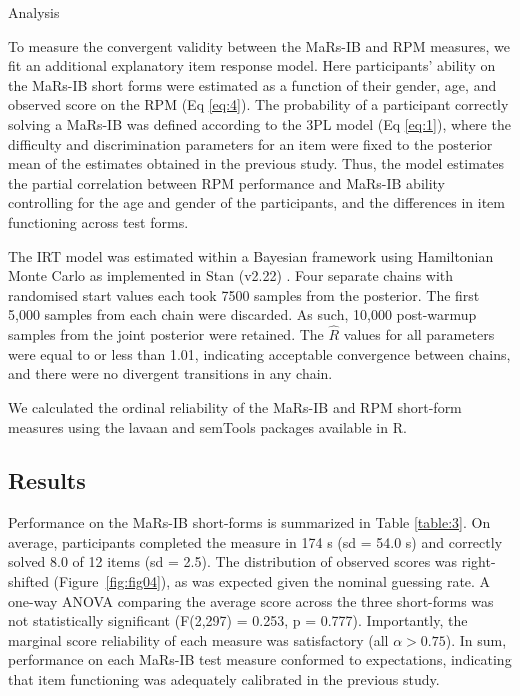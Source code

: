 \documentclass[a4paper,man,natbib]{apa6}
\makeatletter
\renewcommand{\subsubsection}{\@startsection{subsubsection}{3}
  {\z@}%
  {\b@level@two@skip}{\e@level@two@skip}%
  {\normalfont\normalsize\bfseries}}
\makeatother
\begin{document}
\subsubsection{Analysis}

To measure the convergent validity between the MaRs-IB and RPM measures, we fit an additional explanatory item response model. Here participants' ability on the MaRs-IB short forms were estimated as a function of their gender, age, and observed score on the RPM (Eq \ref{eq:4}). The probability of a participant correctly solving a MaRs-IB was defined according to the 3PL model (Eq \ref{eq:1}), where the difficulty and discrimination parameters for an item were fixed to the posterior mean of the estimates obtained in the previous study. Thus, the model estimates the partial correlation between RPM performance and MaRs-IB ability controlling for the age and gender of the participants, and the differences in item functioning across test forms.

The IRT model was estimated within a Bayesian framework using Hamiltonian Monte Carlo as implemented in Stan (v2.22) \citep{carpenter2017stan}. Four separate chains with randomised start values each took 7500 samples from the posterior. The first 5,000 samples from each chain were discarded. As such, 10,000 post-warmup samples from the joint posterior were retained. The $\hat{R}$ values for all parameters were equal to or less than 1.01, indicating acceptable convergence between chains, and there were no divergent transitions in any chain. 

We calculated the ordinal reliability of the MaRs-IB and RPM short-form measures using the lavaan \citep{lavaan} and semTools \citep{semtools} packages available in R.

\subsection{Results}

Performance on the MaRs-IB short-forms is summarized in Table \ref{table:3}. On average, participants completed the measure in 174 s (sd = 54.0 s) and correctly solved 8.0 of 12 items (sd = 2.5). The distribution of observed scores was right-shifted (Figure~\ref{fig:fig04}), as was expected given the nominal guessing rate. A one-way ANOVA comparing the average score across the three short-forms was not statistically significant (F(2,297) = 0.253, p = 0.777). Importantly, the marginal score reliability of each measure was satisfactory (all $\alpha > 0.75$). In sum, performance on each MaRs-IB test measure conformed to expectations, indicating that item functioning was adequately calibrated in the previous study.
\end{document}
